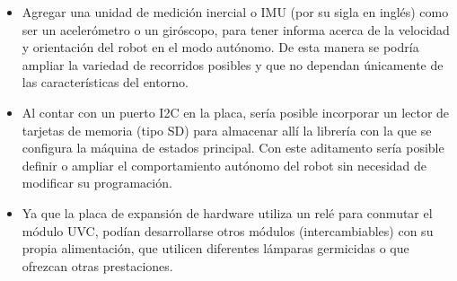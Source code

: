 \begin{itemize}
	\item Agregar una unidad de medición inercial o IMU (por su sigla en inglés) como ser un acelerómetro o un giróscopo, para tener informa acerca de la velocidad y orientación del robot  en el modo autónomo. De esta manera se podría ampliar la variedad de recorridos posibles y que no dependan únicamente de las características del entorno. 
	\item Al contar con un puerto I2C en la placa, sería posible incorporar un lector de tarjetas de memoria (tipo SD) para almacenar allí la librería con la que se configura la máquina de estados principal. Con este aditamento sería posible definir o ampliar el comportamiento autónomo del robot sin necesidad de modificar su programación. 		
	\item Ya que la placa de expansión de hardware utiliza un relé para conmutar el módulo UVC, podían desarrollarse otros módulos (intercambiables) con su propia alimentación, que utilicen diferentes lámparas germicidas o que ofrezcan otras prestaciones.  
\end{itemize}